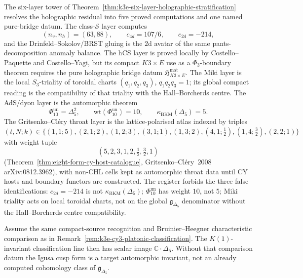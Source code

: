 \begin{remark}
\label{rem:k3e-cy3-six-layer-holographic-register}
The six-layer tower of
Theorem~\ref{thm:k3e-six-layer-holographic-stratification} resolves the
holographic residual into five proved computations and one
named pure-bridge datum. The class-\(\mathcal S\) layer computes
\[
 (n_v,n_h)=(63,88),\qquad
 c_{4d}=107/6,\qquad
 c_{2d}=-214,
\]
and the Drinfeld--Sokolov/BRST gluing is the \(2\)d avatar of the same
pants-decomposition anomaly balance. The hCS layer is proved
locally by Costello--Paquette and Costello--Yagi, but its compact
\(K3\times E\) use as a \(\Phi_3\)-boundary theorem requires the pure
holographic bridge datum
\(\mathfrak H_{K3\times E}^{\mathrm{mat}}\). The Miki layer is the
local \(S_3\)-triality of toroidal charts
\((q_1,q_2,q_3)\), \(q_1q_2q_3=1\); its global compact reading is the
compatibility of that triality with the Hall--Borcherds centre. The
AdS/dyon layer is the automorphic theorem
\[
 \Phi_{10}^{\mathrm{un}}=\Delta_5^2,\qquad
 \mathrm{wt}(\Phi_{10}^{\mathrm{un}})=10,\qquad
 \kappa_{\mathrm{BKM}}(\Delta_5)=5.
\]
The Gritsenko--Cl\'ery throat layer is the lattice-polarised atlas
indexed by triples $(t, N; k) \in \{(1,1;5),(2,1;2),(1,2;3),(3,1;1),(1,3;2),
(4,1;\tfrac12),(1,4;\tfrac32),(2,2;1)\}$ with weight tuple
\[
 (5, 2, 3, 1, 2, \tfrac12, \tfrac32, 1)
\]
(Theorem~\ref{thm:eight-form-cy-host-catalogue},
Gritsenko--Cl\'ery~$2008$ arXiv:0812.3962), with non-CHL cells kept
as automorphic throat data until CY hosts and boundary functors are
constructed. The register forbids the three
false identifications: \(c_{2d}=-214\) is not
\(\kappa_{\mathrm{BKM}}(\Delta_5)\); \(\Phi_{10}^{\mathrm{un}}\) has weight \(10\), not \(5\);
Miki triality acts on local toroidal charts, not on the global
\(\mathfrak g_{\Delta_5}\) denominator without the Hall--Borcherds
centre compatibility.
\end{remark}


\begin{remark}
\label{rem:k3e-cy3-classification}
Assume the same compact-source recognition and Bruinier--Heegner
characteristic comparison as in
Remark~\ref{rem:k3e-cy3-platonic-classification}.  The \(K(1)\)-invariant
classification line then has scalar image \(\mathbb C\cdot\Delta_5\).
Without that comparison datum the Igusa cusp form is a target
automorphic invariant, not an already computed cohomology class of
\(\mathfrak g_{\Delta_5}\).
\end{remark}

